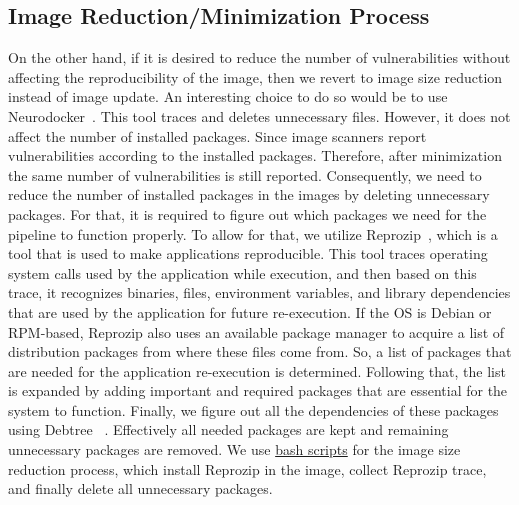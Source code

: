 \documentclass[a4paper,num-refs]{oup-contemporary}
\begin{document}
\subsection{Image Reduction/Minimization Process}
On the other hand, if it is desired to reduce the number of vulnerabilities without affecting the reproducibility of the image,
then we revert to image size reduction instead of image update. An interesting choice to do so would be to use 
Neurodocker~\cite{neurodocker}.
This tool traces and deletes unnecessary files.
However, it does not affect the number of installed packages.
Since image scanners report vulnerabilities according to the installed
packages. Therefore, after
minimization the same number of vulnerabilities is still reported.
Consequently, we need to reduce the number of installed packages
in the images by deleting unnecessary packages. For that, it is required to figure
out which packages we need for the pipeline to function properly. To allow for that, we utilize
Reprozip~\cite{rampin2016reprozip}, which is a tool that
is used to make applications reproducible. This tool traces operating system calls used by the
application while execution, and then based on this trace, it recognizes binaries, files, environment variables,
and library dependencies that are used by the application for future re-execution. If the OS is
Debian or RPM-based, Reprozip also
uses an available package manager to acquire a list of distribution packages from where these files come from.
So, a list of packages that are needed for the application re-execution is determined. Following that, the list
is expanded by adding important and required packages that are essential
for the system to function. Finally, we figure out all the dependencies of these packages using Debtree
~\cite{debtree}.
Effectively all needed packages are kept and remaining unnecessary packages are removed. We use
\href{https://github.com/kaurbhupinder/Vulnerability-Analysis/tree/master/Scripts/minification}{bash scripts} for
the image size reduction process, which install Reprozip in the image, collect Reprozip trace, and
finally delete all unnecessary packages.
\end{document}
